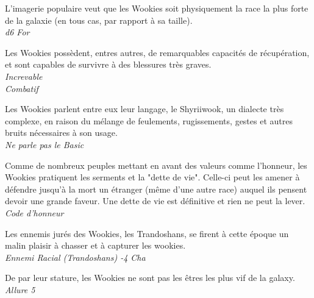 \begin{description}[align=left]
\item [Force de la nature] 				%
	L'imagerie populaire veut que les Wookies soit physiquement la race la plus forte de la galaxie (en tous cas, par rapport à sa taille).\\
	\emph{d6 For}
\item [Increvable] 						%
	Les Wookies possèdent, entres autres, de remarquables capacités de récupération, et sont capables de survivre à des blessures très graves.\\
	\emph{Increvable}\\
	\emph{Combatif}
\item [Shyriiwook] 						%
		Les Wookies parlent entre eux leur langage, le Shyriiwook, un dialecte très complexe, en raison du mélange de feulements, rugissements, gestes et autres bruits nécessaires à son usage.\\
		\emph{Ne parle pas le Basic}
\item [Force \& Honneur] 				%
	Comme de nombreux peuples mettant en avant des valeurs comme l'honneur, les Wookies pratiquent les serments et la "dette de vie". Celle-ci peut les amener à défendre jusqu'à la mort un étranger (même d'une autre race) auquel ils pensent devoir une grande faveur. Une dette de vie est définitive et rien ne peut la lever.\\
	\emph{Code d'honneur}
\item [Ennemis jurés] 					%
	Les ennemis jurés des Wookies, les Trandoshans, se firent à cette époque un malin plaisir à chasser et à capturer les wookies.\\
	\emph{Ennemi Racial (Trandoshans) -4 Cha}
\item [Il faut partir à point] 			%
	De par leur stature, les Wookies ne sont pas les êtres les plus vif de la galaxy.\\
	\emph{Allure 5}
\end{description}